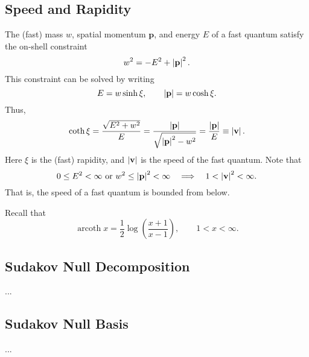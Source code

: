\subsection{Speed and Rapidity}
The (fast) mass $w$, spatial momentum $\mathbf{p}$, and energy $E$ of a fast quantum satisfy the on-shell constraint
\begin{equation}
	{w^{2}} = {-E^{2}} + \left\lvert \mathbf{p} \right\rvert^{2}.
\end{equation}
This constraint can be solved by writing
\begin{equation}
	E = w \operatorname{sinh}{\xi}, \qquad \left\lvert \mathbf{p} \right\rvert = w \operatorname{cosh}{\xi}.
\end{equation}
Thus,
\begin{equation}
	\operatorname{coth}{\xi} = \frac{\sqrt{E^{2} + w^{2}}}{E} = \frac{\left\lvert \mathbf{p} \right\rvert}{\sqrt{\left\lvert \mathbf{p} \right\rvert^{2} - w^{2}}} = \frac{\left\lvert \mathbf{p} \right\rvert}{E} \equiv \left\lvert \mathbf{v} \right\rvert.
\end{equation}
Here $\xi$ is the (fast) rapidity, and $\left\lvert \mathbf{v} \right\rvert$ is the speed of the fast quantum. Note that
\begin{equation}
	0 \leq E^{2} < \infty \text{ or } w^{2} \leq \left\lvert \mathbf{p} \right\rvert^{2} < \infty \quad \Longrightarrow \quad 1 < \left\lvert \mathbf{v} \right\rvert^{2} < \infty.
\end{equation}
That is, the speed of a fast quantum is bounded from below.

Recall that
\begin{equation}
	\operatorname{arcoth}{x} = \frac{1}{2} \log{\left( \frac{x + 1}{x - 1} \right)}, \qquad 1 < x < \infty.
\end{equation}
\subsection{Sudakov Null Decomposition}
...
\subsection{Sudakov Null Basis}
...
